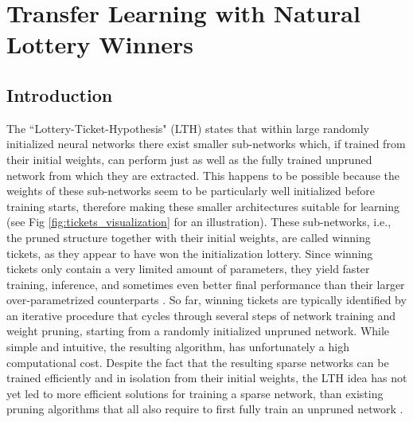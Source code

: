 
\chapter{Transfer Learning with Natural Lottery Winners} %
\label{ch:tl_lth} %


\section{Introduction}
\label{sec:intro}
The ``Lottery-Ticket-Hypothesis" (LTH) \cite{frankle2018lottery} states that within large randomly initialized neural networks there exist smaller sub-networks which, if trained from their initial weights, can perform just as well as the fully trained unpruned network from which they are extracted. This happens to be possible because the weights of these sub-networks seem to be particularly well initialized before training starts, therefore making these smaller architectures suitable for learning (see Fig \ref{fig:tickets_visualization} for an illustration). These sub-networks, i.e., the pruned structure together with their initial weights, are called winning tickets, as they appear to have won the initialization lottery. Since winning tickets only contain a very limited amount of parameters, they yield faster training, inference, and sometimes even better final performance than their larger over-parametrized counterparts \cite{frankle2018lottery,franklestabilizing}. So far, winning tickets are typically identified by an iterative procedure that cycles through several steps of network training and weight pruning, starting from a randomly initialized unpruned network. While simple and intuitive, the resulting algorithm, has unfortunately a high computational cost. Despite the fact that the resulting sparse networks can be trained efficiently and in isolation from their initial weights, the LTH idea has not yet led to more efficient solutions for training a sparse network, than existing pruning algorithms that all also require to first fully train an unpruned network \cite{han2015deep,molchanov2016pruning,dong2017learning,lin2017runtime,zhuang2018discrimination}.

